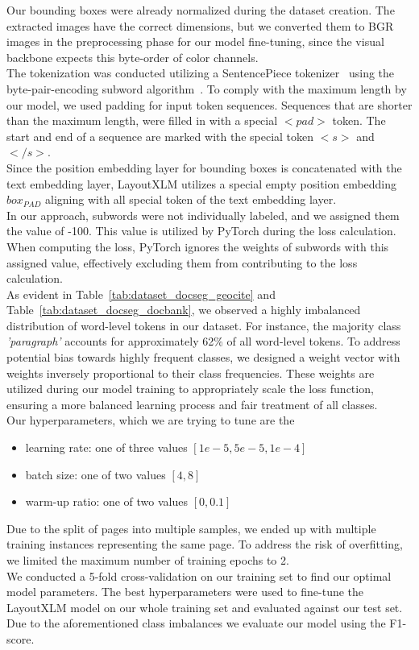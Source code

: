 Our bounding boxes were already normalized during the dataset creation. The extracted images have the correct dimensions, but we converted them to BGR images in the preprocessing phase for our model fine-tuning, since the visual backbone expects this byte-order of color channels.\\
The tokenization was conducted utilizing a SentencePiece tokenizer~\cite{kudo2018sentencepiece} using the byte-pair-encoding subword algorithm~\cite{sennrich2016neural}. To comply with the maximum length by our model, we used padding for input token sequences. Sequences that are shorter than the maximum length, were filled in with a special $<pad>$ token. The start and end of a sequence are marked with the special token $<s>$ and $</s>$.\\
Since the position embedding layer for bounding boxes is concatenated with the text embedding layer, LayoutXLM utilizes a special empty position embedding $box_{PAD}$ aligning with all special token of the text embedding layer.\\
In our approach, subwords were not individually labeled, and we assigned them the value of -100. This value is utilized by PyTorch during the loss calculation. When computing the loss, PyTorch ignores the weights of subwords with this assigned value, effectively excluding them from contributing to the loss calculation.\\
As evident in Table~\ref{tab:dataset_docseg_geocite} and Table~\ref{tab:dataset_docseg_docbank}, we observed a highly imbalanced distribution of word-level tokens in our dataset. For instance, the majority class \textit{'paragraph'} accounts for approximately 62\% of all word-level tokens. To address potential bias towards highly frequent classes, we designed a weight vector with weights inversely proportional to their class frequencies. These weights are utilized during our model training to appropriately scale the loss function, ensuring a more balanced learning process and fair treatment of all classes.\\
Our hyperparameters, which we are trying to tune are the
\begin{itemize}
    \item learning rate: one of three values $[1e-5, 5e-5, 1e-4]$
    \item batch size: one of two values $[4, 8]$
    \item warm-up ratio: one of two values $[0, 0.1]$
\end{itemize}

Due to the split of pages into multiple samples, we ended up with multiple training instances representing the same page. To address the risk of overfitting, we limited the maximum number of training epochs to 2.\\
We conducted a 5-fold cross-validation on our training set to find our optimal model parameters. The best hyperparameters were used to fine-tune the LayoutXLM model on our whole training set and evaluated against our test set. Due to the aforementioned class imbalances we evaluate our model using the F1-score.

